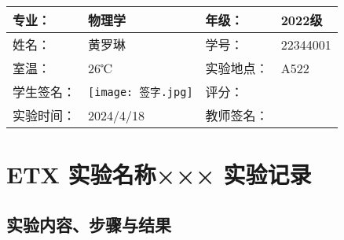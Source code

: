 \documentclass[dvipsnames, svgnames,a4paper,11pt]{article}
\begin{document}
	
	\clearpage
	
	\begin{table}
		\renewcommand\arraystretch{1.7}
		\centering
		\begin{tabularx}{\textwidth}{|X|X|X|X|}
			\hline
			专业： & 物理学 & 年级： & 2022级 \\
			\hline
			姓名： &  黄罗琳& 学号： & 22344001\\
			\hline
			室温： &26℃  & 实验地点： & A522 \\
			\hline
			学生签名：&  \texttt{[image: 签字.jpg]} & 评分： &\\
			\hline
			实验时间：& 2024/4/18 & 教师签名：&\\
			\hline
		\end{tabularx}
	\end{table}
	
	\section{ETX 实验名称×××  \quad\heiti 实验记录}
	
	\subsection{实验内容、步骤与结果}
	
\end{document}
